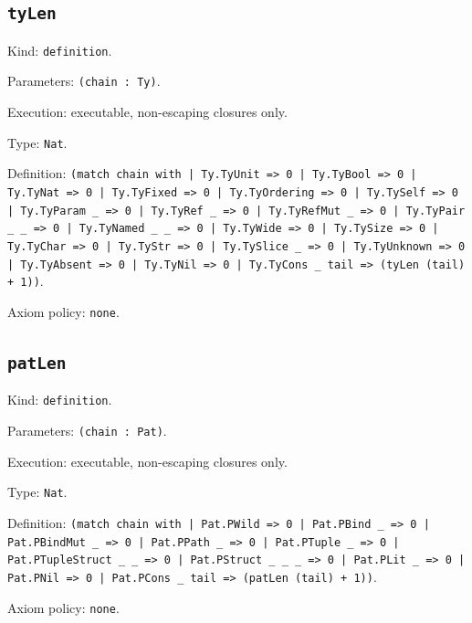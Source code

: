 \documentclass[11pt]{article}
\begin{document}
\subsection*{\texttt{tyLen}}
\noindent Kind: \texttt{definition}.\par
\noindent Parameters: \texttt{(chain : Ty)}.\par
\noindent Execution: executable, non-escaping closures only.\par
\noindent Type: \texttt{Nat}.\par
\noindent Definition: \texttt{(match chain with | Ty.TyUnit => 0 | Ty.TyBool => 0 | Ty.TyNat => 0 | Ty.TyFixed => 0 | Ty.TyOrdering => 0 | Ty.TySelf => 0 | Ty.TyParam \_ => 0 | Ty.TyRef \_ => 0 | Ty.TyRefMut \_ => 0 | Ty.TyPair \_ \_ => 0 | Ty.TyNamed \_ \_ => 0 | Ty.TyWide => 0 | Ty.TySize => 0 | Ty.TyChar => 0 | Ty.TyStr => 0 | Ty.TySlice \_ => 0 | Ty.TyUnknown => 0 | Ty.TyAbsent => 0 | Ty.TyNil => 0 | Ty.TyCons \_ tail => (tyLen (tail) + 1))}.\par
\noindent Axiom policy: \texttt{none}.\par
\subsection*{\texttt{patLen}}
\noindent Kind: \texttt{definition}.\par
\noindent Parameters: \texttt{(chain : Pat)}.\par
\noindent Execution: executable, non-escaping closures only.\par
\noindent Type: \texttt{Nat}.\par
\noindent Definition: \texttt{(match chain with | Pat.PWild => 0 | Pat.PBind \_ => 0 | Pat.PBindMut \_ => 0 | Pat.PPath \_ => 0 | Pat.PTuple \_ => 0 | Pat.PTupleStruct \_ \_ => 0 | Pat.PStruct \_ \_ \_ => 0 | Pat.PLit \_ => 0 | Pat.PNil => 0 | Pat.PCons \_ tail => (patLen (tail) + 1))}.\par
\noindent Axiom policy: \texttt{none}.\par
\end{document}
